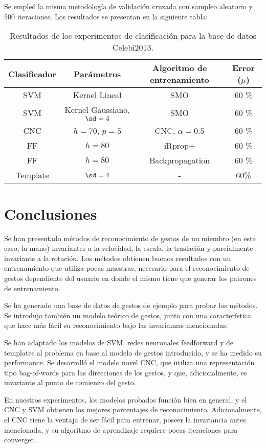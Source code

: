 Se empleó la misma metodología de validación cruzada con sampleo aleatorio y 500 iteraciones. Los resultados se presentan en la siguiente tabla:

\begin{table}[h]
\centering
\small
\begin{tabular}{|c|c|c|c|}
\hline Clasificador & Parámetros & Algoritmo de entrenamiento & Error ($\mu$) \\ 
\hline SVM & Kernel Lineal & SMO &  60 \% \\ 
\hline SVM & Kernel Gaussiano, $\sd=4$ & SMO & 60 \%  \\ 
\hline CNC & $h=70$, $p=5$ & CNC, $\alpha=0.5$ & 60 \% \\ 
\hline FF & $h=80$ & iRprop+ &  60 \% \\ 
\hline FF & $h=80$ &  Backpropagation &  60 \% \\ 
\hline Template & $\sd=4$ & - & 60\% \\ 
\hline 
\end{tabular}
\caption{Resultados de los experimentos de clasificación para la base de datos Celebi2013.} 
\end{table}


\section{Conclusiones}

Se han presentado métodos de reconocimiento de gestos de un miembro (en este caso, la mano) invariantes a la velocidad, la escala, la traslación y parcialmente invariante a la rotación. Los métodos obtienen buenos resultados con un entrenamiento que utiliza pocas muestras, necesario para el reconocimiento de gestos dependiente del usuario en donde el mismo tiene que generar los patrones de entrenamiento.

Se ha generado una base de datos de gestos de ejemplo para probar los métodos. Se introdujo también un modelo teórico de gestos, junto con una característica que hace más fácil su reconocimiento bajo las invarianzas mencionadas. 

Se han adaptado los modelos de SVM, redes neuronales feedforward y de templates al problema en base al modelo de gestos introducido, y se ha medido su performance. Se desarrolló el modelo novel CNC, que utiliza una representación tipo bag-of-words para las direcciones de los gestos, y que, adicionalmente, es invariante al punto de comienzo del gesto.
 
En nuestros experimentos, los modelos probados función bien en general, y el CNC y SVM obtienen los mejores porcentajes de reconocimiento. Adicionalmente, el CNC tiene la ventaja de ser fácil para entrenar, poseer la invariancia antes mencionada, y su algoritmo de aprendizaje requiere pocas iteraciones para converger.

